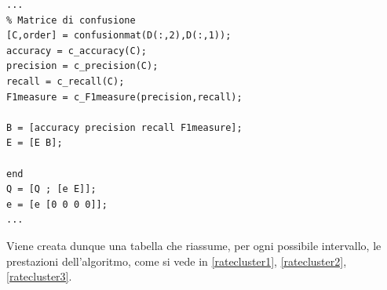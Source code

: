 \begin{lstlisting}[style=Matlab-editor,frame=single, caption=Calcolo delle prestazioni, label=rate]  % Start your code-block
...
% Matrice di confusione
[C,order] = confusionmat(D(:,2),D(:,1));
accuracy = c_accuracy(C);
precision = c_precision(C);
recall = c_recall(C);
F1measure = c_F1measure(precision,recall);

B = [accuracy precision recall F1measure];
E = [E B];

end
Q = [Q ; [e E]];
e = [e [0 0 0 0]];
...
\end{lstlisting}
Viene creata dunque una tabella che riassume, per ogni possibile intervallo, le prestazioni dell'algoritmo, come si vede in \ref{ratecluster1}, \ref{ratecluster2}, \ref{ratecluster3}.
\begin{table}[htp]
	\centering
	\caption{Esempio di tabelle delle prestazioni del clustering}
	\label{ratecluster1}
\end{table}
\begin{table}[htp]
	\centering
	\caption{Esempio di tabelle delle prestazioni del clustering}
	\label{ratecluster2}
\end{table}
